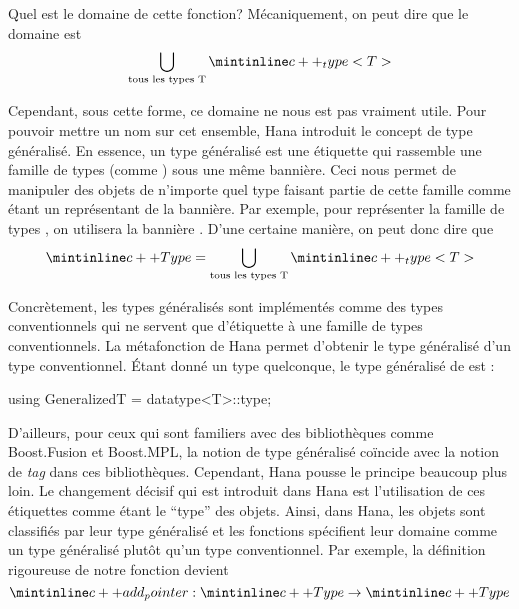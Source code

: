 Quel est le domaine de cette fonction? Mécaniquement, on peut dire que le
domaine est
\[
    \bigcup_{\text{tous les types T}} \icpp{_type<T>}
\]

Cependant, sous cette forme, ce domaine ne nous est pas vraiment utile. Pour
pouvoir mettre un nom sur cet ensemble, Hana introduit le concept de type
généralisé. En essence, un type généralisé est une étiquette qui rassemble
une famille de types (comme ) sous une même bannière. Ceci
nous permet de manipuler des objets de n'importe quel type faisant partie
de cette famille comme étant un représentant de la bannière. Par exemple,
pour représenter la famille de types , on utilisera la
bannière . D'une certaine manière, on peut donc dire que
\[
    \icpp{Type} = \bigcup_{\text{tous les types T}} \icpp{_type<T>}
\]

Concrètement, les types généralisés sont implémentés comme des types
conventionnels qui ne servent que d'étiquette à une famille de types
conventionnels. La métafonction  de Hana permet d'obtenir
le type généralisé d'un type conventionnel. Étant donné un type 
quelconque, le type généralisé de  est :
\begin{cpp}
    using GeneralizedT = datatype<T>::type;
\end{cpp}

D'ailleurs, pour ceux qui sont familiers avec des bibliothèques comme
Boost.Fusion et Boost.MPL, la notion de type généralisé coïncide avec
la notion de \textit{tag} dans ces bibliothèques. Cependant, Hana pousse
le principe beaucoup plus loin. Le changement décisif qui est introduit dans
Hana est l'utilisation de ces étiquettes comme étant le ``type'' des objets.
Ainsi, dans Hana, les objets sont classifiés par leur type généralisé et les
fonctions spécifient leur domaine comme un type généralisé plutôt qu'un
type conventionnel. Par exemple, la définition rigoureuse de notre fonction
 devient
\[
    \icpp{add_pointer} : \icpp{Type} \to \icpp{Type}
\]

